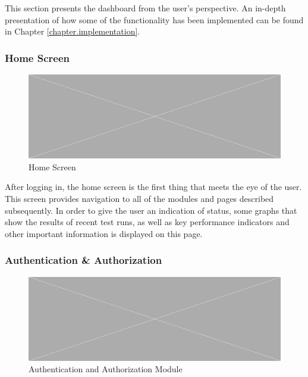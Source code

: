 This section presents the dashboard from the user's perspective. An in-depth presentation of how some of the functionality has been implemented can be found in Chapter \ref{chapter.implementation}.





\subsubsection{Home Screen}

\comment{\info[inline]{}}

\begin{figure}[h]
    \centering
    \includegraphics[width=\textwidth]{figures/placeholder.png}
    \caption{Home Screen}
    \label{fig.home}
\end{figure}
\noindent
After logging in, the home screen is the first thing that meets the eye of the user. This screen provides navigation to all of the modules and pages described subsequently. In order to give the user an indication of status, some graphs that show the results of recent test runs, as well as key performance indicators and other important information is displayed on this page.


\subsubsection{Authentication \& Authorization}


\begin{figure}[h]
    \centering
    \includegraphics[width=\textwidth]{figures/placeholder.png}
    \caption{Authentication and Authorization Module}
    \label{fig.tc_mod}
\end{figure}

